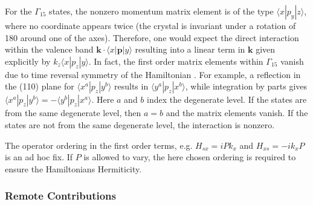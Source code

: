 For the $\Gamma_{15}$ states, the nonzero momentum matrix element
is of the type $\langle x|p_{y}|z\rangle$, where no coordinate appears
twice \citet{Yu2005} (the crystal is invariant under a rotation of
180\textdegree{} around one of the axes). Therefore, one would expect
the direct interaction within the valence band $\mathbf{k}\cdot\langle x|\mathbf{p}|y\rangle$
resulting into a linear term in $\mathbf{k}$ given explicitly by
$k_{z}\langle x|p_{z}|y\rangle$. In fact, the first order matrix
elements within $\Gamma_{15}$ vanish due to time reversal symmetry
of the Hamiltonian \citet{Dresselhaus1955a}. For example, a reflection
in the (110) plane for $\langle x^{a}|p_{z}|y^{b}\rangle$ results
in $\langle y^{a}|p_{z}|x^{b}\rangle$, while integration by parts
gives $\langle x^{a}|p_{z}|y^{b}\rangle=-\langle y^{b}|p_{z}|x^{a}\rangle$.
Here $a$ and $b$ index the degenerate level. If the states are from
the same degenerate level, then $a=b$ and the matrix elements vanish.
If the states are not from the same degenerate level, the interaction
is nonzero.

The operator ordering in the first order terms, e.g. $H_{sx}=iPk_{x}$
and $H_{xs}=-ik_{x}P$ is an ad hoc fix. If $P$ is allowed to vary,
the here chosen ordering is required to ensure the Hamiltonians Hermiticity.


\subsubsection{Remote Contributions}

